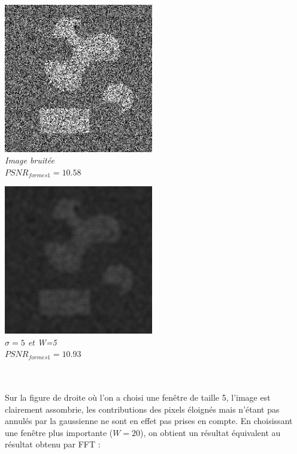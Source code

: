 \documentclass[a4,12pt]{article}
\begin{document}
\noindent
\begin{minipage}[c]{0.50\linewidth}
	\begin{center}
		\includegraphics[width = 65mm]{./img/2sp5.jpg}\\
		\textit{Image bruitée}\\
		\textit{$PSNR_{formes1}=10.58$}
	\end{center}
\end{minipage}
\begin{minipage}[c]{0.50\linewidth}
	\begin{center}
		\includegraphics[width = 65mm]{./img/2sp5-5-5}\\
		\textit{$\sigma=5$ et W=5}\\
		\textit{$PSNR_{formes1}=10.93$}
	\end{center}
\end{minipage}\\
\\
Sur la figure de droite où l'on a choisi une fenêtre de taille 5, l'image est clairement assombrie, les contributions des pixels éloignés mais n'étant pas annulés par la gaussienne ne sont en effet pas prises en compte. En choisissant une fenêtre plus importante ($W = 20$), on obtient un résultat équivalent au résultat obtenu par FFT :\\
\end{document}
